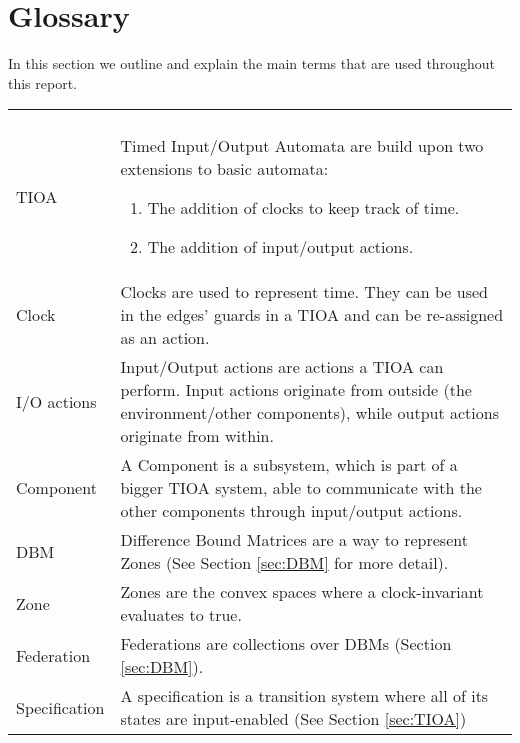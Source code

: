 \section{Glossary}
In this section we outline and explain the main terms that are used throughout this report.

{\renewcommand{\arraystretch}{1.5}
\begin{xltabular}{\linewidth}[H]{>{\aautstyle}l|X}
    \endfirsthead
    \endhead
    \endfoot
    \endlastfoot
    \\
    TIOA & Timed Input/Output Automata are build upon two extensions to basic automata:
    \begin{enumerate}
        \item The addition of clocks to keep track of time.
        \item The addition of input/output actions.
    \end{enumerate} \\
    Clock & Clocks are used to represent time. They can be used in the edges' guards in a TIOA and can be re-assigned as an action. \\
    I/O actions & Input/Output actions are actions a TIOA can perform. Input actions originate from outside (the environment/other components), while output actions originate from within. \\
    Component & A Component is a subsystem, which is part of a bigger TIOA system, able to communicate with the other components through input/output actions. \\
    DBM & Difference Bound Matrices are a way to represent Zones (See Section \ref{sec:DBM} for more detail).\\
    Zone & Zones are the convex spaces where a clock-invariant evaluates to true. \\
    Federation & Federations are collections over DBMs (Section \ref{sec:DBM}). \\
    Specification &  A specification is a transition system where all of its states are input-enabled (See Section \ref{sec:TIOA})\\%

\end{xltabular}}
